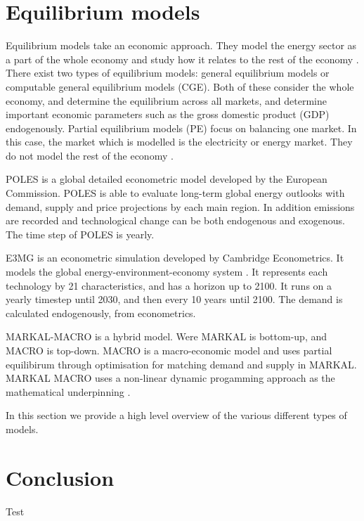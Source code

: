 \section{Equilibrium models}
\label{sec:litreview:equilibrium}

Equilibrium models take an economic approach. They model the energy sector as a part of the whole economy and study how it relates to the rest of the economy \cite{Ringkjob2018}. There exist two types of equilibrium models: general equilibrium models or computable general equilibrium models (CGE). Both of these consider the whole economy, and determine the equilibrium across all markets, and determine important economic parameters such as the gross domestic product (GDP) endogenously. Partial equilibrium models (PE) focus on balancing one market. In this case, the market which is modelled is the electricity or energy market. They do not model the rest of the economy \cite{Ringkjob2018, Hall2016a}. 

POLES is a global detailed econometric model developed by the European Commission. POLES is able to evaluate long-term global energy outlooks with demand, supply and price projections by each main region. In addition  emissions are recorded and technological change can be both endogenous and exogenous. The time step of POLES is yearly.

E3MG is an econometric simulation developed by Cambridge Econometrics. It models the global energy-environment-economy system \cite{Dagoumas2010}. It represents each technology by 21 characteristics, and has a horizon up to 2100. It runs on a yearly timestep until 2030, and then every 10 years until 2100. The demand is calculated endogenously, from econometrics.

MARKAL-MACRO is a hybrid model. Were MARKAL is bottom-up, and MACRO is top-down. MACRO is a macro-economic model and uses partial equilibirum through optimisation for matching demand and supply in MARKAL. MARKAL MACRO uses a non-linear dynamic progamming approach as the mathematical underpinning \cite{Hall2016a}.

\label{sec:litreview:models}

In this section we provide a high level overview of the various different types of models. 


\section{Conclusion}
\label{sec:litreview:conclusion}


Test